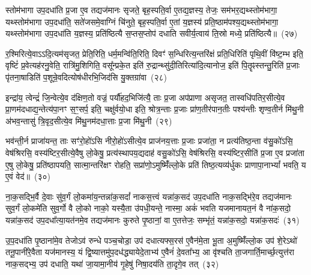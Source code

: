 स्तोम॑भागा उप॒दधा॑ति प्र॒जा ए॒व तद्यज॑मानः सृजते॒ बृह॒स्पति॒र्वा ए॒तद्य॒ज्ञस्य॒ तेजः॒ सम॑भर॒द्यथ्स्तोम॑भागा॒ यथ्स्तोम॑भागा उप॒दधा॑ति॒ सते॑जसमे॒वाग्निं चि॑नुते॒ बृह॒स्पति॒र्वा ए॒तां य॒ज्ञस्य॑ प्रति॒ष्ठाम॑पश्य॒द्यथ्स्तोम॑भागा॒ यथ्स्तोम॑भागा उप॒दधा॑ति य॒ज्ञस्य॒ प्रति॑ष्ठित्यै स॒प्तस॒प्तोप॑ दधाति सवीर्य॒त्वाय॑ ति॒स्रो मध्ये॒ प्रति॑ष्ठित्यै॥~(२७)

{\anuvakamend[{उ॒त्त॒र॒तो ध॑त्ते॒ तस्मा॑दुपधी॒यन्त॒ ऋष॑यो\-ऽसृजत॒ यत् त्रिच॑त्वारिꣳशच्च}]}%

र॒श्मिरित्ये॒वा\-ऽऽ\-दि॒त्यम॑सृजत॒ प्रेति॒रिति॒ धर्म॒मन्वि॑ति॒रिति॒ दिवꣳ॑ स॒न्धिरित्य॒न्तरि॑क्षं प्रति॒धिरिति॑ पृथि॒वीं वि॑ष्ट॒म्भ इति॒ वृष्टिं॑ प्र॒वेत्यह॑रनु॒वेति॒ रात्रि॑मु॒शिगिति॒ वसू᳚न्प्रके॒त इति॑ रु॒द्रान्थ्सु॑दी॒तिरित्या॑दि॒त्यानोज॒ इति॑ पि॒तॄꣴस्तन्तु॒रिति॑ प्र॒जाः पृ॑तना॒षाडिति॑ प॒शून्रे॒वदित्योष॑धीरभि॒जिद॑सि यु॒क्तग्रा॑वा~(२८)

इन्द्रा॑य॒ त्वेन्द्रं॑ जि॒न्वेत्ये॒व द॑क्षिण॒तो वज्रं॒ पर्यौ॑हद॒भिजि॑त्यै॒ ताः प्र॒जा अप॑प्राणा असृजत॒ तास्वधि॑\-पतिर॒सीत्ये॒व प्रा॒णम॑दधाद्य॒न्तेत्य॑पा॒नꣳ स॒ꣳ॒सर्प॒ इति॒ चक्षु॑र्वयो॒धा इति॒ श्रोत्र॒न्ताः प्र॒जाः प्रा॑ण॒तीर॑पान॒तीः पश्य॑न्तीः शृण्व॒तीर्न मि॑थु॒नी अ॑भव॒न्तासु॑ त्रि॒वृद॒सीत्ये॒व मि॑थु॒नम॑दधा॒त्ताः प्र॒जा मि॑थु॒नी~(२९)

भव॑न्ती॒र्न प्राजा॑यन्त॒ ताः सꣳ॑रो॒हो॑\-ऽसि नीरो॒हो॑\-ऽसीत्ये॒व प्राज॑नय॒त्ताः प्र॒जाः प्रजा॑ता॒ न प्रत्य॑तिष्ठ॒न्ता व॑सु॒को॑\-ऽसि॒ वेष॑श्रिरसि॒ वस्य॑ष्टिर॒सीत्ये॒वैषु लो॒केषु॒ प्रत्य॑स्थापय॒द्यदाह॑ वसु॒को॑\-ऽसि॒ वेष॑श्रिरसि॒ वस्य॑ष्टिर॒सीति॑ प्र॒जा ए॒व प्रजा॑ता ए॒षु लो॒केषु॒ प्रति॑\-ष्ठापयति॒ सात्मा॒न्तरि॑क्षꣳ रोहति॒ सप्रा॑णो॒\-ऽमुष्मिँ॑ल्लो॒के प्रति॑ तिष्ठ॒त्यव्य॑र्धुकः प्राणापा॒ना\-भ्यां᳚ भवति॒ य ए॒वं वेद॑॥~(३०)

{\anuvakamend[{यु॒क्तग्रा॑वा प्र॒जा मि॑थु॒न्य॑न्तरि॑क्षं॒ द्वाद॑श च}]}%

ना॒क॒सद्भि॒र्वै दे॒वाः सु॑व॒र्गं लो॒कमा॑य॒न्तन्ना॑क॒सदां᳚ नाकस॒त्त्वं यन्ना॑क॒सद॑ उप॒दधा॑ति नाक॒सद्भि॑रे॒व तद्यज॑मानः सुव॒र्गं लो॒कमे॑ति सुव॒र्गो वै लो॒को नाको॒ यस्यै॒ता उ॑पधी॒यन्ते॒ नास्मा॒ अकं॑ भवति यजमानायत॒नं वै ना॑क॒सदो॒ यन्ना॑क॒सद॑ उप॒दधा᳚त्या॒यत॑नमे॒व तद्यज॑मानः कुरुते पृ॒ष्ठानां॒ वा ए॒तत्तेजः॒ सम्भृ॑तं॒ यन्ना॑क॒सदो॒ यन्ना॑क॒सदः॑~(३१)

उ॒प॒दधा॑ति पृ॒ष्ठाना॑मे॒व तेजो\-ऽव॑ रुन्धे पञ्च॒चोडा॒ उप॑ दधात्यफ्स॒रस॑ ए॒वैन॑मे॒ता भू॒ता अ॒मुष्मिँ॑ल्लो॒क उप॑ शे॒रे\-ऽथो॑ तनू॒पानी॑रे॒वैता यज॑मानस्य॒ यं द्वि॒ष्यात्तमु॑प॒दध॑द्ध्यायेदे॒ताभ्य॑ ए॒वैनं॑ दे॒वता᳚भ्य॒ आ वृ॑श्चति ता॒जगार्ति॒मार्च्छ॒त्युत्त॑रा नाक॒सद्भ्य॒ उप॑ दधाति॒ यथा॑ जा॒यामा॒नीय॑ गृ॒हेषु॑ निषा॒दय॑ति ता॒दृगे॒व तत्~(३२)

